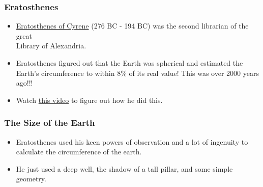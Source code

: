 \begin{frame}
\frametitle{Eratosthenes}


\begin{itemize}
\item \href{http://en.wikipedia.org/wiki/Eratosthenes}{Eratosthenes of Cyrene} (276 BC - 194 BC) was the second librarian of the great\\ Library of Alexandria.
\item Eratosthenes figured out that the Earth was spherical and estimated the Earth's circumference to within 8\% of its real value! This was over 2000 years ago!!!
\item Watch	\href{http://www.youtube.com/watch?v=8On7yCU1EjQ}{this video} to figure out how he did this.
\end{itemize}
\end{frame}

\begin{frame}
\frametitle{The Size of the Earth}
\begin{itemize}
\item Eratosthenes used his keen powers of observation and a lot of ingenuity to calculate the circumference of the earth.

\item He just used a deep well, the shadow of a tall pillar, and some simple geometry.
\end{itemize}
\medskip


\bigskip

\end{frame}

